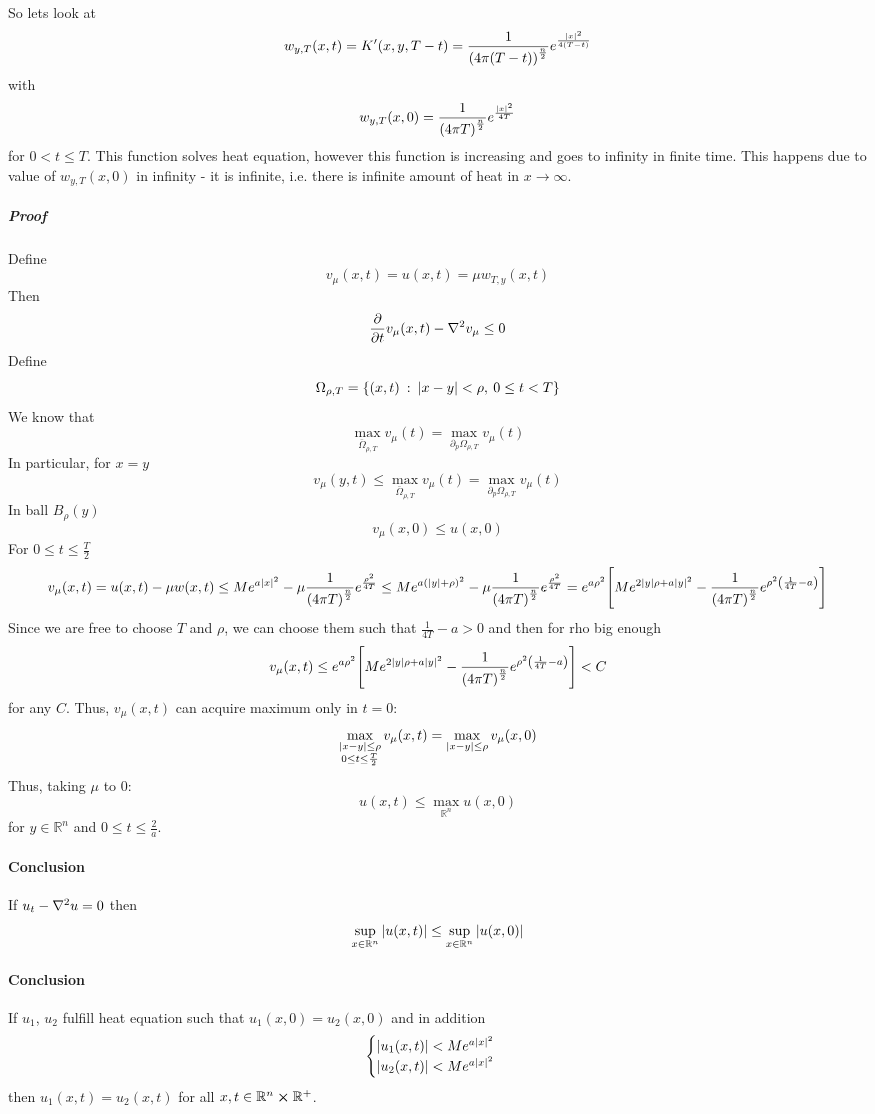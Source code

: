 So lets look at
$$w_{y,T}(x,t) = K'(x,y,T-t) = \frac{1}{\qty(4\pi (T-t))^{\frac{n}{2}}} e^{\frac{\abs{x}^2}{4(T-t)}}$$
with
$$w_{y,T}(x,0) = \frac{1}{\qty(4\pi T)^{\frac{n}{2}}} e^{\frac{\abs{x}^2}{4T}} $$
for $0<t\leq T$.
This function solves heat equation, however this function is increasing and goes to infinity in finite time. This happens due to value of $w_{y,T}(x,0) $ in infinity - it is infinite, i.e. there is infinite amount of heat in $x\to \infty$.
\subparagraph{Proof}
Define
$$v_\mu(x,t) = u(x,t) = \mu w_{T,y} (x,t)$$
Then
$$\pdv{t} v_\mu(x,t) - \laplacian{v_\mu} \leq 0$$
Define 
$$\Omega_{\rho, T} = \left\{ (x,t)  \: : \: \abs{x-y} < \rho, \: 0 \leq t < T \right\}$$
We know that
$$\max\limits_{ \bar{\Omega}_{\rho,T}} v_\mu(t) = \max\limits_{ \partial_p\Omega_{\rho,T}} v_\mu(t)$$
In particular, for $x=y$
$$v_\mu(y,t) \leq \max\limits_{ \bar{\Omega}_{\rho,T}} v_\mu(t) = \max\limits_{ \partial_p\Omega_{\rho,T}} v_\mu(t)$$
In ball $B_{\rho}(y)$
$$v_\mu (x,0) \leq u(x,0)$$
For $0\leq t\leq \frac{T}{2}$
$$v_{\mu}(x,t) = u(x,t) - \mu w(x, t) \leq Me^{a\abs{x}^2} - \mu \frac{1}{\qty(4\pi T)^{\frac{n}{2}}} e^{\frac{\rho^2}{4T}} \leq Me^{a\qty(\abs{y}+\rho)^2} - \mu \frac{1}{\qty(4\pi T)^{\frac{n}{2}}} e^{\frac{\rho^2}{4T}}= e^{a\rho^2} \qty[Me^{2\abs{y}\rho + a\abs{y}^2} - \frac{1}{\qty(4\pi T)^{\frac{n}{2}}} e^{\rho^2 \qty(\frac{1}{4T}-a)}]$$
Since we are free to choose $T$ and $\rho$, we can choose them such that $\frac{1}{4T}-a>0$ and then for rho big enough
$$v_{\mu}(x,t) \leq e^{a\rho^2} \qty[Me^{2\abs{y}\rho + a\abs{y}^2} - \frac{1}{\qty(4\pi T)^{\frac{n}{2}}} e^{\rho^2 \qty(\frac{1}{4T}-a)}] < C$$
for any $C$.
Thus, $v_\mu(x,t)$ can acquire maximum only in $t=0$:
$$\max\limits_{\substack{\abs{x-y}\leq\rho \\ 0\leq t\leq \frac{T}{2}}} v_\mu(x,t) = \max\limits_{\abs{x-y}\leq\rho } v_\mu(x,0)$$
Thus, taking $\mu$ to $0$:
$$u(x,t) \leq \max_{\mathbb{R}^n} u(x,0)$$
for $y \in \mathbb{R}^n$ and $0\leq t \leq \frac{2}{a}$.
\paragraph{Conclusion}
If $u_t - \laplacian{u} = 0$ then
$$\sup\limits_{x\in \mathbb{R}^n} \abs{u(x,t) } \leq \sup\limits_{x\in \mathbb{R}^n} \abs{u(x,0)}$$
\paragraph{Conclusion}
If $u_1$, $u_2$ fulfill heat equation such that $u_1(x,0) = u_2(x,0)$ and in addition
$$\begin{cases}
\abs{u_1(x,t)} < Me^{a\abs{x}^2}\\
\abs{u_2(x,t)} < Me^{a\abs{x}^2}\\
\end{cases}$$
then $u_1(x,t) = u_2(x,t)$ for all $x,t \in \mathbb{R}^n \cross \mathbb{R}^+$.

